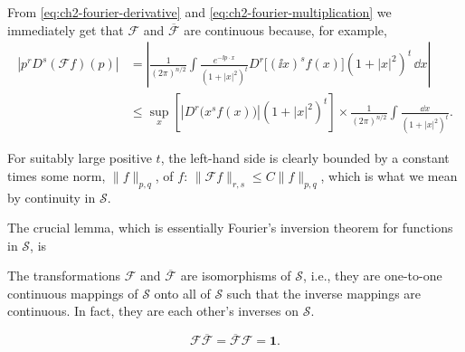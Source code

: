 From \eqref{eq:ch2-fourier-derivative} and \eqref{eq:ch2-fourier-multiplication} we immediately get that $\mathcal{F}$ and
$\overline{\mathcal{F}}$ are continuous because, for example,
\begin{equation}
\begin{aligned}
 \left|p^rD^s(\mathcal{F}f)(p)\right|
 &=\left|
 \frac{1}{(2\pi)^{n/2}}
 \int \frac{e^{-\ii p\cdot x}}{(1+|x|^2)^t}
 D^r\bigl[(\ii x)^s f(x)\bigr](1+|x|^2)^t\,\dd x
 \right| \\
 &\leq \sup_x\left[
 \left|D^r\bigl(x^s f(x)\bigr)\right|(1+|x|^2)^t
 \right]
 \times \frac{1}{(2\pi)^{n/2}}
 \int\frac{\dd x}{(1+|x|^2)^t} .
\end{aligned}
\tag{2-37}\label{eq:ch2-fourier-continuity-bound}
\end{equation}

For suitably large positive $t$, the left-hand side is clearly bounded by a
constant times some norm, $\lVert f\rVert_{p,q}$, of $f$:
$\lVert\mathcal{F}f\rVert_{r,s}\leq C\lVert f\rVert_{p,q}$, which is what
we mean by continuity in $\mathcal{S}$.

The crucial lemma, which is essentially Fourier's inversion theorem for
functions in $\mathcal{S}$, is

\begin{trivlist}
\item[\hskip\labelsep\bfseries Lemma]\mbox{}\par
The transformations $\mathcal{F}$ and $\overline{\mathcal{F}}$ are
isomorphisms of $\mathcal{S}$, i.e., they are one-to-one continuous
mappings of $\mathcal{S}$ onto all of $\mathcal{S}$ such that the inverse
mappings are continuous.  In fact, they are each other's inverses on
$\mathcal{S}$.

\begin{equation}
  \mathcal{F}\overline{\mathcal{F}}
  =\overline{\mathcal{F}}\mathcal{F}=\mathbf{1} .
  \tag{2-38}\label{eq:ch2-fourier-schwartz-inverse}
\end{equation}
\end{trivlist}

